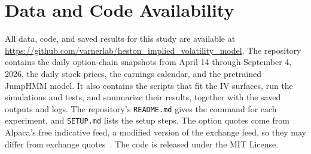 \section*{Data and Code Availability}\label{sec:data_availability}

All data, code, and saved results for this study are available at \url{https://github.com/varnerlab/heston_implied_volatility_model}. The repository contains the daily option-chain snapshots from April 14 through September 4, 2026, the daily stock prices, the earnings calendar, and the pretrained JumpHMM model. It also contains the scripts that fit the IV surfaces, run the simulations and tests, and summarize their results, together with the saved outputs and logs. The repository's \texttt{README.md} gives the command for each experiment, and \texttt{SETUP.md} lists the setup steps. The option quotes come from Alpaca's free indicative feed, a modified version of the exchange feed, so they may differ from exchange quotes~\cite{alpaca_option_feed}. The code is released under the MIT License.
